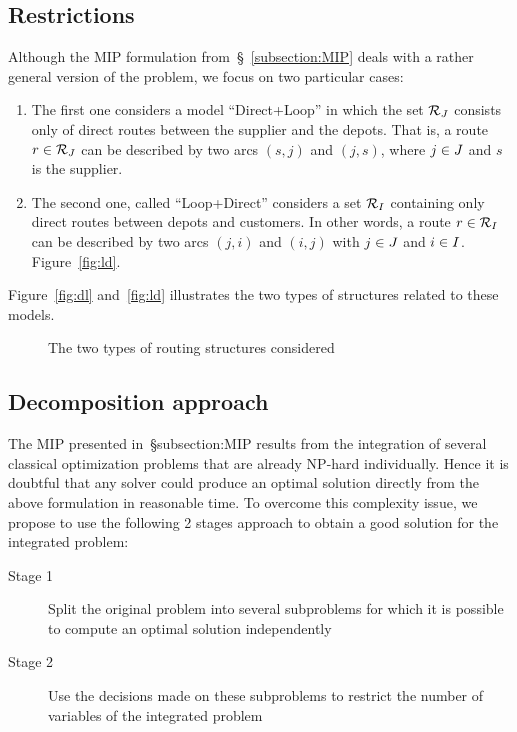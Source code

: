 \documentclass[a4paper,10pt]{article}
\begin{document}
\begin{linenumbers}
\subsection{Restrictions}
Although the MIP formulation from~\S~\ref{subsection:MIP} deals with a rather general version of the problem, we focus on two particular cases:
\begin{enumerate}
    \item The first one considers a model ``Direct+Loop'' in which the set $\mathcal{R}_J$ consists only of direct routes between the supplier and the depots. 
        That is, a route $r\in\mathcal{R}_J$ can be described by two arcs $(s,j)$ and $(j,s)$, where $j\in J$ and $s$ is the supplier.
    \item The second one, called ``Loop+Direct'' considers a set $\mathcal{R}_I$ containing only direct routes between depots and customers. 
        In other words, a route $r\in\mathcal{R}_I$ can be described by two arcs $(j,i)$ and $(i,j)$ with $j\in J$ and $i\in I$. Figure~\ref{fig:ld}.
\end{enumerate}
Figure~\ref{fig:dl} and~\ref{fig:ld} illustrates the two types of structures related to these models.
\begin{figure}
    \centering
    \caption{The two types of routing structures considered}
\end{figure}

\subsection{Decomposition approach}
The MIP presented in~\S{subsection:MIP} results from the integration of several classical optimization problems that are already NP-hard individually. 
Hence it is doubtful that any solver could produce an optimal solution directly from the above formulation in reasonable time.
To overcome this complexity issue, we propose to use the following 2 stages approach to obtain a good solution for the integrated problem: 
\begin{description}
    \item[Stage 1] Split the original problem into several subproblems for which it is possible to compute an optimal solution independently
    \item[Stage 2] Use the decisions made on these subproblems to restrict the number of variables of the integrated problem 
\end{description}


\end{linenumbers}
\end{document}
